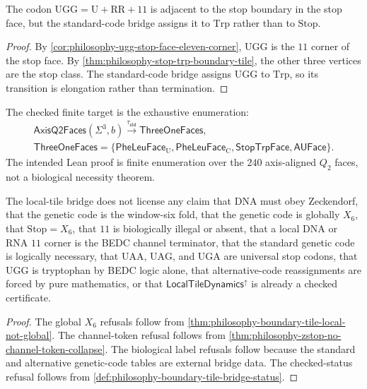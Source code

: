 \begin{corollary}
\label{cor:philosophy-ugg-continuation-corner}
The codon $\mathrm{UGG}=\mathrm{U}+\mathrm{RR}+11$ is adjacent to the stop
boundary in the stop face, but the standard-code bridge assigns it to
$\mathrm{Trp}$ rather than to $\mathrm{Stop}$.
\end{corollary}
\begin{proof}
By \autoref{cor:philosophy-ugg-stop-face-eleven-corner}, $\mathrm{UGG}$ is
the $11$ corner of the stop face. By
\autoref{thm:philosophy-stop-trp-boundary-tile}, the other three vertices
are the stop class. The standard-code bridge assigns $\mathrm{UGG}$ to
$\mathrm{Trp}$, so its transition is elongation rather than termination.
\end{proof}

\begin{definition}
\label{def:philosophy-local-tile-finite-formalization-target}
The checked finite target is the exhaustive enumeration:
$$
\begin{gathered}
  \mathsf{AxisQ2Faces}(\Sigma^{3},b)
  \xrightarrow{\tau_{\mathsf{std}}}
  \mathsf{ThreeOneFaces},\\
  \mathsf{ThreeOneFaces}
  =
  \{\mathsf{PheLeuFace}_{\mathrm{U}},
    \mathsf{PheLeuFace}_{\mathrm{C}},
    \mathsf{StopTrpFace},
    \mathsf{AUFace}\}.
\end{gathered}
$$
The intended Lean proof is finite enumeration over the $240$ axis-aligned
$Q_{2}$ faces, not a biological necessity theorem.
\end{definition}

\begin{theorem}
\label{thm:philosophy-boundary-tile-cannot-claim-boundary}
The local-tile bridge does not license any claim that DNA must obey
Zeckendorf, that the genetic code is the window-six fold, that the genetic
code is globally $X_{6}$, that $\mathrm{Stop}=X_{6}$, that $11$ is
biologically illegal or absent, that a local DNA or RNA $11$ corner is the
BEDC channel terminator, that the standard genetic code is logically
necessary, that $\mathrm{UAA}$, $\mathrm{UAG}$, and $\mathrm{UGA}$ are
universal stop codons, that $\mathrm{UGG}$ is tryptophan by BEDC logic
alone, that alternative-code reassignments are forced by pure
mathematics, or that $\mathsf{LocalTileDynamics}^{\uparrow}$ is already a
checked certificate.
\end{theorem}
\begin{proof}
The global $X_{6}$ refusals follow from
\autoref{thm:philosophy-boundary-tile-local-not-global}. The channel-token
refusal follows from
\autoref{thm:philosophy-zstop-no-channel-token-collapse}. The biological
label refusals follow because the standard and alternative genetic-code
tables are external bridge data. The checked-status refusal follows from
\autoref{def:philosophy-boundary-tile-bridge-status}.
\end{proof}

